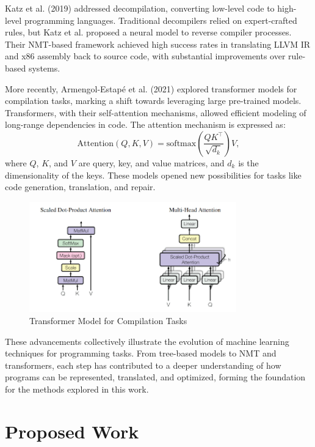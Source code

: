 \documentclass{dhbenelux}
\begin{document}
Katz et al. (2019) addressed decompilation, converting low-level code to high-level programming languages. Traditional decompilers relied on expert-crafted rules, but Katz et al. proposed a neural model to reverse compiler processes. Their NMT-based framework achieved high success rates in translating LLVM IR and x86 assembly back to source code, with substantial improvements over rule-based systems. 

More recently, Armengol-Estapé et al. (2021) explored transformer models for compilation tasks, marking a shift towards leveraging large pre-trained models. Transformers, with their self-attention mechanisms, allowed efficient modeling of long-range dependencies in code. The attention mechanism is expressed as:
\[
\text{Attention}(Q, K, V) = \text{softmax}\left(\frac{QK^\top}{\sqrt{d_k}}\right)V,
\]
where \( Q \), \( K \), and \( V \) are query, key, and value matrices, and \( d_k \) is the dimensionality of the keys. These models opened new possibilities for tasks like code generation, translation, and repair.

\begin{figure}[h]
    \centering
    \includegraphics[width=0.8\textwidth]{Images/5.png} %
    \caption{Transformer Model for Compilation Tasks}
    \label{fig:transformer-code}
\end{figure}

These advancements collectively illustrate the evolution of machine learning techniques for programming tasks. From tree-based models to NMT and transformers, each step has contributed to a deeper understanding of how programs can be represented, translated, and optimized, forming the foundation for the methods explored in this work.


\section{Proposed Work}
\end{document}
